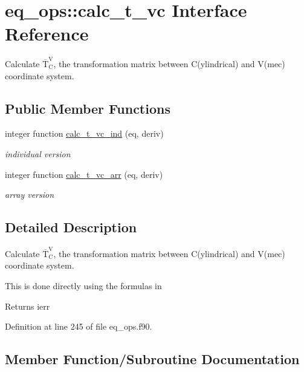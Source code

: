 \hypertarget{interfaceeq__ops_1_1calc__t__vc}{}\section{eq\+\_\+ops\+:\+:calc\+\_\+t\+\_\+vc Interface Reference}
\label{interfaceeq__ops_1_1calc__t__vc}


Calculate $\overline{\text{T}}_\text{C}^\text{V}$, the transformation matrix between C(ylindrical) and V(mec) coordinate system.  


\subsection*{Public Member Functions}
\begin{DoxyCompactItemize}
\item 
integer function \hyperlink{interfaceeq__ops_1_1calc__t__vc_a76001b9e5f1811edd02b4cca49774897}{calc\+\_\+t\+\_\+vc\+\_\+ind} (eq, deriv)
\begin{DoxyCompactList}\small\item\em individual version \end{DoxyCompactList}\item 
integer function \hyperlink{interfaceeq__ops_1_1calc__t__vc_a2670ea34e0bbfc9aeeb7c0422075ea8b}{calc\+\_\+t\+\_\+vc\+\_\+arr} (eq, deriv)
\begin{DoxyCompactList}\small\item\em array version \end{DoxyCompactList}\end{DoxyCompactItemize}


\subsection{Detailed Description}
Calculate $\overline{\text{T}}_\text{C}^\text{V}$, the transformation matrix between C(ylindrical) and V(mec) coordinate system. 

This is done directly using the formula\textquotesingle{}s in \cite{Weyens3D}

\begin{DoxyReturn}{Returns}
ierr 
\end{DoxyReturn}


Definition at line 245 of file eq\+\_\+ops.\+f90.



\subsection{Member Function/\+Subroutine Documentation}
\mbox{\label{interfaceeq__ops_1_1calc__t__vc_a2670ea34e0bbfc9aeeb7c0422075ea8b}} 
